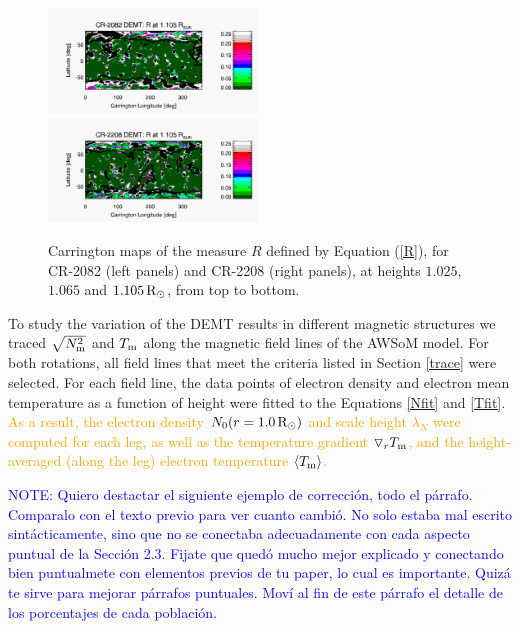 \documentclass[namedreferences]{solarphysics}
\newcommand{\mrsun}{{\rm R_\odot}}
\newcommand{\lN}{\lambda_N}
\newcommand{\dr}{\triangledown_r}
\newcommand{\Tm}{T_{\rm m}}
\newcommand{\aTm}{\left<\Tm\right>}
\newcommand{\Nsqm}{N^2_{{\rm m}}}
\newcommand{\sqravgN}{\sqrt{\Nsqm}}
\def\albert#1{\textcolor{orange}{#1}}
\def\notebyalbert#1{\textcolor{blue}{NOTE: #1}}
\begin{document}
\begin{article}
\begin{figure}[h!]
\begin{center}
\includegraphics[width=0.495\textwidth]{figs/map_R_CR2082_DEMT-EUVI_behind_H1-L3523_r3d_1105_Rsun.pdf}
\includegraphics[width=0.495\textwidth]{figs/map_R_CR2208_DEMT-AIA_H1_L522_r3d_1105_Rsun.pdf}
\caption{{Carrington maps of the measure $R$ defined by Equation (\ref{R}), for CR-2082 (left panels) and CR-2208 (right panels), at heights $1.025$, $1.065$ and $1.105\,\mrsun$, from top to bottom}. }
\label{carmaps_R_2082_2208}
\end{center}
\end{figure}

{To study the variation of the DEMT results in different magnetic structures we traced $\sqravgN$ and $\Tm$ along the magnetic field lines of the AWSoM model.} For both rotations, all field lines that meet the criteria listed in Section \ref{trace} were selected. For each field line, the data points of electron density and electron mean temperature as a function of height were fitted to the Equations \ref{Nfit} and \ref{Tfit}. \albert{As a result, the electron density $N_0(r=1.0\,\mrsun)$ and scale height $\lN$ were computed for each leg, as well as the temperature gradient $\dr\Tm$, and the height-averaged (along the leg) {electron temperature} $\aTm$.}

\noindent\notebyalbert{Quiero destactar el siguiente ejemplo de corrección, todo el párrafo. Comparalo con el texto previo para ver cuanto cambió. No solo estaba mal escrito sintácticamente, sino que no se conectaba adecuadamente con cada aspecto puntual de la Sección 2.3. Fijate que quedó mucho mejor explicado y conectando bien puntualmete con elementos previos de tu paper, lo cual es importante. Quizá te sirve para mejorar párrafos puntuales. Moví al fin de este párrafo el detalle de los porcentajes de cada población.}


\end{article}
\end{document}
